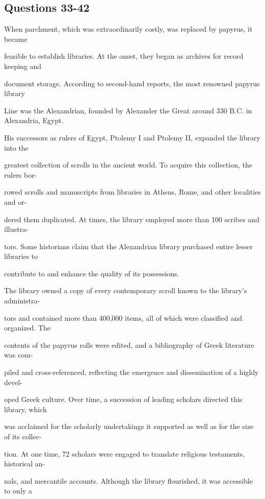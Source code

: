 \documentclass[12pt]{article}
\begin{document}
\subsection*{Questions 33-42}
\begingroup
\small
\sloppy
\setlength{\parskip}{0pt}
\setlength{\parindent}{0pt}
When parchment, which was extraordinarily costly, was replaced by papyrus, it became\par
feasible to establish libraries. At the onset, they began as archives for record keeping and\par
document storage. According to second-hand reports, the most renowned papyrus library\par
Line was the Alexandrian, founded by Alexander the Great around 330 B.C. in Alexandria, Egypt.\par
His successors as rulers of Egypt, Ptolemy I and Ptolemy II, expanded the library into the\par
greatest collection of scrolls in the ancient world. To acquire this collection, the rulers bor-\par
rowed scrolls and manuscripts from libraries in Athens, Rome, and other localities and or-\par
dered them duplicated. At times, the library employed more than 100 scribes and illustra-\par
tors. Some historians claim that the Alexandrian library purchased entire lesser libraries to\par
contribute to and enhance the quality of its possessions.\par
The library owned a copy of every contemporary scroll known to the library's administra-\par
tors and contained more than 400,000 items, all of which were classified and organized. The\par
contents of the papyrus rolls were edited, and a bibliography of Greek literature was com-\par
piled and cross-referenced, reflecting the emergence and dissemination of a highly devel-\par
oped Greek culture. Over time, a succession of leading scholars directed this library, which\par
was acclaimed for the scholarly undertakings it supported as well as for the size of its collec-\par
tion. At one time, 72 scholars were engaged to translate religious testaments, historical an-\par
nals, and mercantile accounts. Although the library flourished, it was accessible to only a\par
\end{document}
